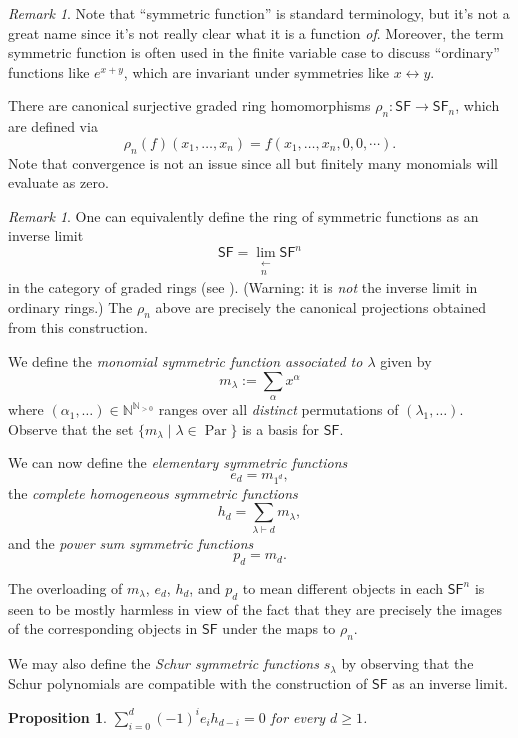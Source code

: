 \documentclass[12pt]{article}
\theoremstyle{plain}
\newtheorem{proposition}[theorem]{Proposition}
\theoremstyle{definition}
\theoremstyle{remark}
\newtheorem{remark}[theorem]{Remark}
\numberwithin{equation}{section}
\begin{document}
\begin{remark}
Note that ``symmetric function'' is standard terminology,
but it's not a great name since it's not
really clear what it is a function \emph{of}.
Moreover, the term symmetric function is often used in the finite
variable case to discuss ``ordinary'' functions like $e^{x+y}$,
which are invariant under symmetries like $x \leftrightarrow y$.
\end{remark}

There are canonical surjective graded ring homomorphisms
$\rho_n : \mathsf{SF} \to \mathsf{SF}_n$, which are defined via
\[
\rho_n(f)(x_1,\ldots,x_n) = f(x_1,\ldots,x_n,0,0,\cdots) .
\]
Note that convergence is not an issue since all but finitely many monomials
will evaluate as zero.

\begin{remark}
One can equivalently define the ring of symmetric functions as an inverse
limit
\[
\mathsf{SF} = \lim_{\substack{\longleftarrow\\n}} \mathsf{SF}^n
\]
in the category of graded rings (see \cite{Macdonald}).
(Warning: it is \emph{not} the inverse limit in ordinary rings.)
The $\rho_n$ above are precisely the canonical projections obtained from
this construction.
\end{remark}

We define the \emph{monomial symmetric function associated to $\lambda$}
given by
\[
m_\lambda := \sum_{\alpha} x^\alpha
\]
where $(\alpha_1,\ldots) \in \mathbb{N}^{\mathbb{N}_{>0}}$ ranges over all
\emph{distinct} permutations of $(\lambda_1,\ldots)$.
Observe that the set $\{ m_\lambda \mid \lambda \in
\operatorname{Par}\}$ is a basis for $\mathsf{SF}$.

We can now define the \emph{elementary symmetric functions}
\[
e_d = m_{1^d},
\]
the \emph{complete homogeneous symmetric functions}
\[
h_d = \sum_{\lambda \vdash d} m_\lambda ,
\]
and the \emph{power sum symmetric functions}
\[
p_d = m_{d}.
\]

The overloading of $m_\lambda$, $e_d$, $h_d$, and $p_d$ to mean
different objects in each $\mathsf{SF}^n$ is seen to be mostly harmless
in view of the fact that they are precisely the images of the
corresponding objects in $\mathsf{SF}$ under the maps to $\rho_n$.

We may also define the \emph{Schur symmetric functions}
$s_\lambda$ by observing that the Schur polynomials are compatible
with the construction of $\mathsf{SF}$ as an inverse limit.

\begin{proposition} \label{prop:fund_rel}
$\displaystyle\sum_{i=0}^d (-1)^i e_i h_{d-i}=0$ for every $d \ge 1$.
\end{proposition}
\end{document}
